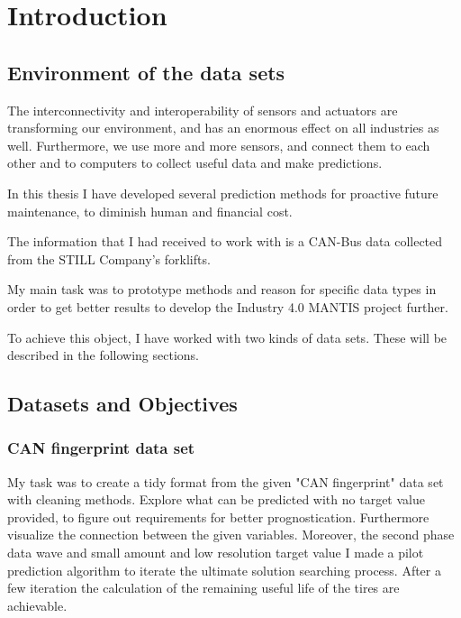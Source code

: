 \chapter*{Introduction}
\setcounter{chapter}{1}
\section{Environment of the data sets}
The interconnectivity and interoperability \cite{TalebArchInsSys} of sensors and actuators are transforming our environment, and has an enormous effect on all industries as well. Furthermore, we use more and more sensors, and connect them to each other and to computers to collect useful data and make predictions.

In this thesis I have developed several prediction methods for proactive future maintenance, to diminish human and financial cost.

The information that I had received to work with is a CAN-Bus data collected from the STILL Company's forklifts.

My main task was to prototype methods and reason for specific data types in order to get better results to develop the Industry 4.0 \cite{Indfourpointzero,} MANTIS project further. \cite{PaliHCsCPS}\cite{HCsCPS2}\cite{GartnerIoT}\cite{HuangCPS}\cite{Pali}\cite{HCsCPS}\cite{ProMain}

To achieve this object, I have worked with two kinds of data sets. These will be described in the following sections.
\section{Datasets and Objectives}
    \subsection{CAN fingerprint data set}
\noindent
My task was to create a tidy format from the given "CAN fingerprint" data set with cleaning methods. Explore what can be predicted with no target value provided, to figure out requirements for better prognostication. Furthermore visualize the connection between the given variables. Moreover, the second phase data wave and small amount and low resolution target value I made a pilot prediction algorithm to iterate the ultimate solution searching process. 
\noindent
After a few iteration the calculation of the remaining useful life of the tires are achievable. 

